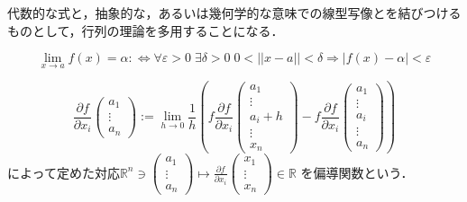 \documentclass[uplatex, dvipdfmx]{jsreport}
\begin{document}
代数的な式と，抽象的な，あるいは幾何学的な意味での線型写像とを結びつけるものとして，行列の理論を多用することになる．

\begin{definition}[収束]
    \[\lim_{x\to a}f(x)=\alpha :\Leftrightarrow \forall\varepsilon >0\;\exists\delta >0\; 0<||x-a||<\delta\Rightarrow |f(x)-\alpha |<\varepsilon\]
\end{definition}

\begin{definition}[偏微分]
    \[ \frac{\partial f}{\partial x_i} \left(\begin{array}{c}a_1 \\ \vdots \\ a_n\end{array}\right):=\lim_{h\to 0}\frac{1}{h}\left( f\frac{\partial f}{\partial x_i} \left(\begin{array}{c}a_1 \\ \vdots \\a_i+h\\ \vdots \\ x_n\end{array}\right)-f\frac{\partial f}{\partial x_i} \left(\begin{array}{c}a_1 \\ \vdots \\ a_i \\ \vdots \\ a_n\end{array}\right) \right) \]
    によって定めた対応$\mathbb{R}^n\ni\left(\begin{array}{c}a_1 \\ \vdots \\ a_n\end{array}\right)\mapsto \frac{\partial f}{\partial x_i}\left(\begin{array}{c}x_1 \\ \vdots \\ x_n\end{array}\right)\in\mathbb{R}$
    を偏導関数という．
\end{definition}
\end{document}
